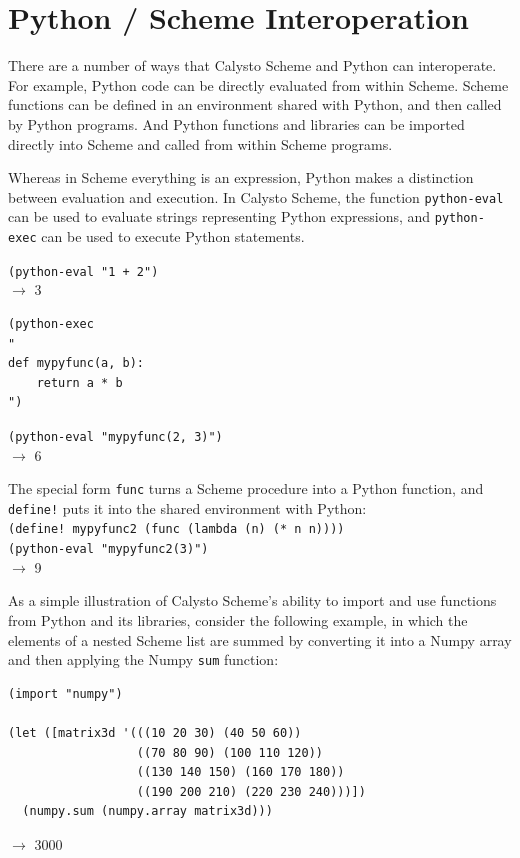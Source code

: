 \documentclass[acmsmall,screen,authorversion]{acmart}
\begin{document}
\section{Python / Scheme Interoperation}

There are a number of ways that Calysto Scheme and Python can interoperate. For
example, Python code can be directly evaluated from within Scheme. Scheme
functions can be defined in an environment shared with Python, and then called
by Python programs. And Python functions and libraries can be imported directly
into Scheme and called from within Scheme programs.

Whereas in Scheme everything is an expression, Python makes a distinction
between evaluation and execution. In Calysto Scheme, the function
\texttt{python-eval} can be used to evaluate strings representing Python
expressions, and \texttt{python-exec} can be used to execute Python
statements.\\

{\small
\noindent
\texttt{(python-eval "1 + 2")}\\
$\rightarrow$ 3

\noindent
\begin{verbatim}
(python-exec
"
def mypyfunc(a, b):
    return a * b
")
\end{verbatim}
\noindent\texttt{(python-eval "mypyfunc(2, 3)")}\\
$\rightarrow$ 6\\
}

\noindent
The special form \texttt{func} turns a Scheme procedure into a Python function,
and \texttt{define!} puts it into the shared environment with Python:\\

{\small
\noindent
\texttt{(define! mypyfunc2 (func (lambda (n) (* n n))))}\\
\texttt{(python-eval "mypyfunc2(3)")}\\
$\rightarrow$ 9\\
}

\noindent
As a simple illustration of Calysto Scheme's ability to import and use
functions from Python and its libraries, consider the following example, in
which the elements of a nested Scheme list are summed by converting it into a
Numpy array and then applying the Numpy \texttt{sum} function:\\

\begin{minipage}{\textwidth}
{\small
\begin{verbatim}
(import "numpy")

(let ([matrix3d '(((10 20 30) (40 50 60))
                  ((70 80 90) (100 110 120))
                  ((130 140 150) (160 170 180))
                  ((190 200 210) (220 230 240)))])
  (numpy.sum (numpy.array matrix3d)))
\end{verbatim}
$\rightarrow$ 3000\\
}
\end{minipage}
\end{document}
